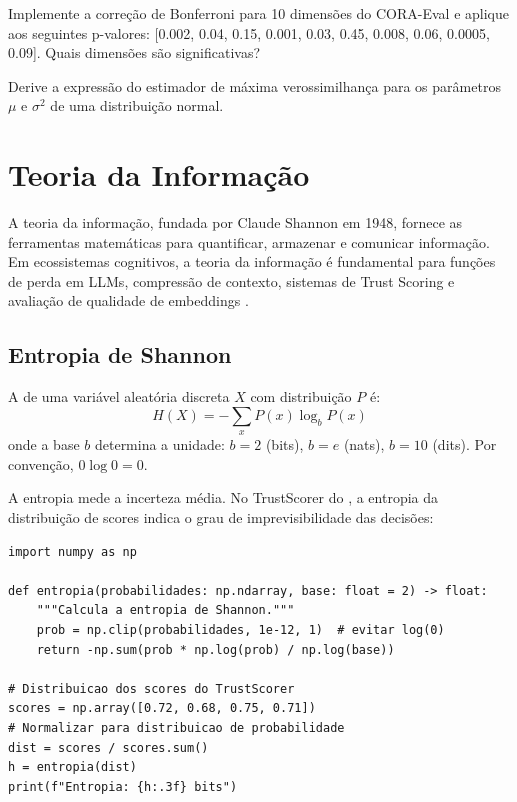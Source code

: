 \begin{exercicio}
    Implemente a correção de Bonferroni para 10 dimensões do CORA-Eval e
    aplique aos seguintes p-valores: [0.002, 0.04, 0.15, 0.001, 0.03, 0.45,
    0.008, 0.06, 0.0005, 0.09]. Quais dimensões são significativas?
\end{exercicio}

\begin{exercicio}
    Derive a expressão do estimador de máxima verossimilhança para os
    parâmetros $\mu$ e $\sigma^2$ de uma distribuição normal.
\end{exercicio}

\section{Teoria da Informação}
\label{sec:teoria-informacao}
\nivelavancado

A teoria da informação, fundada por Claude Shannon em 1948, fornece as
ferramentas matemáticas para quantificar, armazenar e comunicar informação.
Em ecossistemas cognitivos, a teoria da informação é fundamental para
funções de perda em LLMs, compressão de contexto, sistemas de Trust Scoring
e avaliação de qualidade de embeddings \cite{cover2006elements,
goodfellow2016deep}.

\subsection{Entropia de Shannon}

\begin{definicao}[Entropia]
    A  de uma variável aleatória discreta $X$ com
    distribuição $P$ é:
    \[
    H(X) = -\sum_{x} P(x) \log_b P(x)
    \]
    onde a base $b$ determina a unidade: $b = 2$ (bits), $b = e$ (nats),
    $b = 10$ (dits). Por convenção, $0 \log 0 = 0$.
\end{definicao}

\begin{exemplo}
    A entropia mede a incerteza média. No TrustScorer do \opencodeeco{}, a
    entropia da distribuição de scores indica o grau de imprevisibilidade
    das decisões:
    \begin{lstlisting}[style=pythonstyle]
import numpy as np

def entropia(probabilidades: np.ndarray, base: float = 2) -> float:
    """Calcula a entropia de Shannon."""
    prob = np.clip(probabilidades, 1e-12, 1)  # evitar log(0)
    return -np.sum(prob * np.log(prob) / np.log(base))

# Distribuicao dos scores do TrustScorer
scores = np.array([0.72, 0.68, 0.75, 0.71])
# Normalizar para distribuicao de probabilidade
dist = scores / scores.sum()
h = entropia(dist)
print(f"Entropia: {h:.3f} bits")
    \end{lstlisting}
\end{exemplo}

